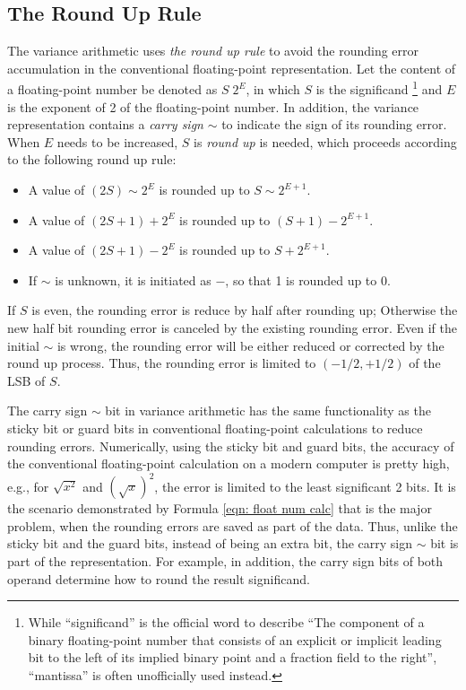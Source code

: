 \documentclass[twoside]{article}
\numberwithin{equation}{section}
\begin{document}
\subsection{The Round Up Rule}

The variance arithmetic uses \emph{the round up rule} to avoid the rounding error accumulation in the conventional floating-point representation.
Let the content of a floating-point number be denoted as $S\; 2^E$, in which $S$ is the significand \footnote{While ``significand'' is the official word \cite{Floating_Point_Standard} to describe ``The component of a binary floating-point number that consists of an explicit or implicit leading bit to the left of its implied binary point and a fraction field to the right'', ``mantissa'' is often unofficially used instead.} and $E$ is the exponent of 2 of the floating-point number.  
In addition, the variance representation contains a \emph{carry sign} $\sim$  to indicate the sign of its rounding error.
When $E$ needs to be increased, $S$ is \emph{round up} is needed, which proceeds according to the following round up rule:
\begin{itemize}
\item A value of $(2S) \sim 2^E$ is rounded up to $S \sim 2^{E+1}$.  

\item A value of $(2S+1)\!+\!2^E$ is rounded up to $(S+1)\!-\!2^{E+1}$.
  
\item A value of $(2S+1)\!-\!2^E$ is rounded up to $S\!+\!2^{E+1}$.

\item If $\sim$ is unknown, it is initiated as $-$, so that 1 is rounded up to 0.
\end{itemize}

If $S$ is even, the rounding error is reduce by half after rounding up; Otherwise the new half bit rounding error is canceled by the existing rounding error.
Even if the initial $\sim$ is wrong, the rounding error will be either reduced or corrected by the round up process. 
Thus, the rounding error is limited to $(-1/2, +1/2)$ of the LSB of $S$.

The carry sign $\sim$ bit in variance arithmetic has the same functionality as the sticky bit or guard bits in conventional floating-point calculations  to reduce rounding errors.
Numerically, using the sticky bit and guard bits, the accuracy of the conventional floating-point calculation on a modern computer is pretty high, e.g., for $\sqrt{x^2}$ and $(\sqrt{x})^2$, the error is limited to the least significant 2 bits.
It is the scenario demonstrated by Formula \eqref{eqn: float num calc} that is the major problem, when the rounding errors are saved as part of the data.
Thus, unlike the sticky bit and the guard bits, instead of being an extra bit, the carry sign $\sim$ bit is part of the representation.
For example, in addition, the carry sign bits of both operand determine how to round the result significand. 
\end{document}
